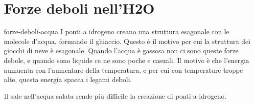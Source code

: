 \documentclass[preview]{standalone}
\begin{document}
\section{Forze deboli nell'H2O}

\begin{snippet}{forze-deboli-acqua}
    I ponti a idrogeno creano una struttura esagonale con le molecole d'acqua,
    formando il ghiaccio.
    Questo è il motivo per cui la struttura dei giocchi di neve è esagonale.
    Quando l'acqua è gassosa non ci sono queste forze debole, e quando sono
    liquide ce ne sono poche e casuali.
    Il motivo è che l'energia aumuenta con l'aumentare della temperatura,
    e per cui con temperature troppe alte, questa energia spacca i legami deboli.

    Il sale nell'acqua salata rende più difficile la creazione di ponti a idrogeno.

\end{snippet}
\end{document}
